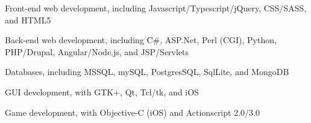 \begin{plainlist}
	\item Front-end web development, including Javascript/Typescript/jQuery, CSS/SASS, and HTML5
	\item Back-end web development, including C\#, ASP.Net, Perl (CGI), Python, PHP/Drupal, Angular/Node.js, and JSP/Servlets
	\item Databases, including MSSQL, mySQL, PostgresSQL, SqlLite, and MongoDB
	\item GUI development, with GTK+, Qt, Tcl/tk, and iOS
	\item Game development, with Objective-C (iOS) and Actionscript 2.0/3.0
\end{plainlist}
